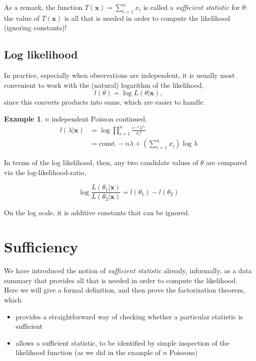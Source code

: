 \documentclass[
]{book}
\providecommand{\tightlist}{%
  \setlength{\itemsep}{0pt}\setlength{\parskip}{0pt}}
\newcommand{\bx}{{\boldsymbol x}}
\newcommand{\const}{\text{const.}}
\theoremstyle{definition}
\theoremstyle{definition}
\newtheorem{example}{Example}[chapter]
\theoremstyle{definition}
\theoremstyle{definition}
\theoremstyle{remark}
\begin{document}
As a remark, the function \(T(\bx)=\sum_{i=1}^n x_i\) is called a \emph{sufficient statistic} for \(\theta\): the value of \(T(\bx)\) is all that is needed in order to compute the likelihood (ignoring constants)!

\hypertarget{log-likelihood}{%
\subsection{Log likelihood}\label{log-likelihood}}

In practice, especially when observations are independent, it is usually most convenient to work with the (natural) logarithm of the likelihood,
\[
l(\theta) = \log L(\theta|\bx),
\]
since this converts products into sums, which are easier to
handle.

\begin{example}
\(n\) independent Poisson continued.
\begin{align*}
l(\lambda|\bx) 
&= \log \prod_{i=1}^n \frac{e^{-\lambda}\lambda^{x_i}}{x_i!} \\
&= \const -n\lambda + \left( \sum_{i=1}^n x_i \right)\log\lambda
\end{align*}
\end{example}

In terms of the log likelihood, then, any two candidate values of \(\theta\) are compared via the log-likelihood-ratio,

\[
 \log \frac{L(\theta_1|\bx)}{L(\theta_2|\bx)} = l(\theta_1) - l(\theta_2) 
\]

On the log scale, it is additive constants that can be ignored.

\hypertarget{sufficiency}{%
\section{Sufficiency}\label{sufficiency}}

We have introduced the notion of \emph{sufficient statistic} already, informally, as a data summary that provides all that is needed in order to compute the likelihood.
Here we will give a formal definition, and then prove the factorization theorem, which

\begin{itemize}
\tightlist
\item
  provides a straightforward way of checking whether a particular statistic is sufficient
\item
  allows a sufficient statistic, to be identified by simple inspection of the likelihood function (as we did in the example of \(n\) Poissons)
\end{itemize}
\end{document}
